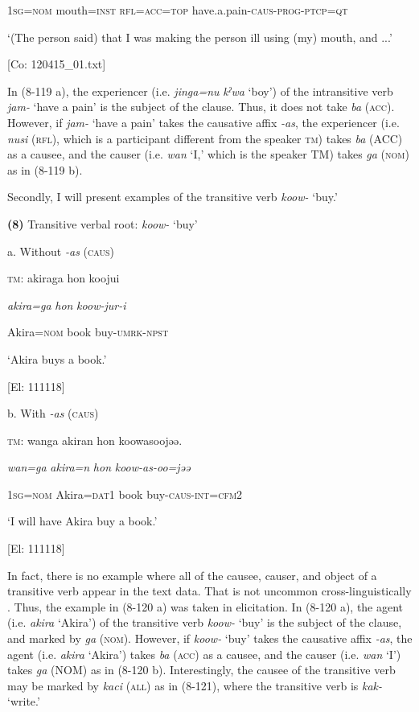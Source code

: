     1\textsc{sg}=\textsc{nom}  mouth=\textsc{inst}  \textsc{rfl}=\textsc{acc}=\textsc{top}  have.a.pain-\textsc{caus}-\textsc{prog}-\textsc{ptcp}=\textsc{qt}

    ‘(The person\textit{\textsubscript{} }said) that I was making the person ill using (my) mouth, and ...’

    [Co: 120415\_01.txt]

In (8-119 a), the experiencer (i.e. \textit{jinga=nu} \textit{kˀwa} ‘boy’) of the intransitive verb \textit{jam-} ‘have a pain’ is the subject of the clause. Thus, it does not take \textit{ba} (\textsc{acc}). However, if \textit{jam-} ‘have a pain’ takes the causative affix \textit{{}-as}, the experiencer (i.e. \textit{nusi} (\textsc{rfl}), which is a participant different from the speaker \textsc{tm}) takes \textit{ba} (ACC) as a causee, and the causer (i.e. \textit{wan} ‘I,’ which is the speaker TM) takes \textit{ga} (\textsc{nom}) as in (8-119 b).

  Secondly, I will present examples of the transitive verb \textit{koow-} ‘buy.’

\textbf{(8)}  Transitive verbal root: \textit{koow-} ‘buy’

  a. Without \textit{-as} (\textsc{caus})

  \textsc{tm}:  akiraga  {\textbar}hon{\textbar}  koojui

    \textit{akira=ga}  \textit{hon}  \textit{koow{}-jur-i}

    Akira=\textsc{nom}  book  buy-\textsc{umrk}-\textsc{npst}

    ‘Akira buys a book.’

    [El: 111118]

  b. With \textit{-as} (\textsc{caus})

  \textsc{tm}:  wanga  akiran  {\textbar}hon{\textbar}  koowasoojəə.

    \textit{wan=ga}  \textit{akira=n}  \textit{hon}  \textit{koow-as{}-oo=jəə}

    1\textsc{sg}=\textsc{nom}  Akira=\textsc{dat}1  book  buy-\textsc{caus}-\textsc{int}=\textsc{cfm}2

    ‘I will have Akira buy a book.’

    [El: 111118]

In fact, there is no example where all of the causee, causer, and object of a transitive verb appear in the text data. That is not uncommon cross-linguistically \citep[79]{Dryer2007}. Thus, the example in (8-120 a) was taken in elicitation. In (8-120 a), the agent (i.e. \textit{akira} ‘Akira’) of the transitive verb \textit{koow-} ‘buy’ is the subject of the clause, and marked by \textit{ga} (\textsc{nom}). However, if \textit{koow-} ‘buy’ takes the causative affix \textit{{}-as}, the agent (i.e. \textit{akira} ‘Akira’) takes \textit{ba} (\textsc{acc}) as a causee, and the causer (i.e. \textit{wan} ‘I’) takes \textit{ga} (NOM) as in (8-120 b). Interestingly, the causee of the transitive verb may be marked by \textit{kaci} (\textsc{all}) as in (8-121), where the transitive verb is \textit{kak-} ‘write.’


